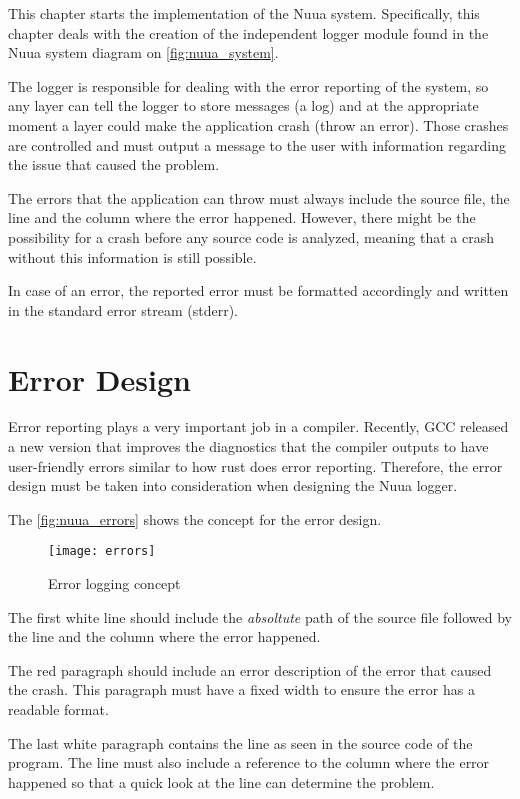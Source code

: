 This chapter starts the implementation of the Nuua system. Specifically, this chapter deals with the
creation of the independent logger module found in the Nuua system diagram on \autoref{fig:nuua_system}.

The logger is responsible for dealing with the error reporting of the system, so any layer can tell the logger
to store messages (a log) and at the appropriate moment a layer could make the application crash (throw an error). Those
crashes are controlled and must output a message to the user with information regarding the issue that caused the problem.

The errors that the application can throw must always include the source file, the line and the column where
the error happened. However, there might be the possibility for a crash before any source code is analyzed, meaning that a crash without
this information is still possible.

In case of an error, the reported error must be formatted accordingly and written in the standard error stream (stderr).

\section{Error Design}

Error reporting plays a very important job in a compiler. Recently, GCC released a new version that improves the diagnostics
that the compiler outputs to have user-friendly errors similar to how rust does error reporting. Therefore, the error design must
be taken into consideration when designing the Nuua logger.

The \autoref{fig:nuua_errors} shows the concept for the error design.

\begin{figure}[H]
    \centering
    \texttt{[image: errors]}
    \caption{Error logging concept}
    \label{fig:nuua_errors}
\end{figure}

The first white line should include the \emph{absoltute} path of the source file followed by the line and the column where the error happened.

The red paragraph should include an error description of the error that caused the crash. This paragraph must have a fixed width to ensure
the error has a readable format.

The last white paragraph contains the line as seen in the source code of the program. The line must also include a reference to the column
where the error happened so that a quick look at the line can determine the problem.


